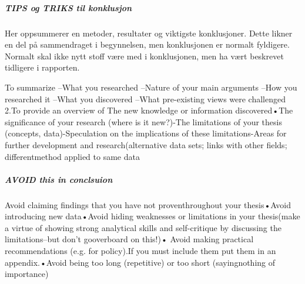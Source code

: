 \subparagraph{TIPS og TRIKS til konklusjon}
Her oppsummerer en metoder, resultater og viktigste konklusjoner. Dette likner en del på 
sammendraget i begynnelsen, men konklusjonen er normalt fyldigere. Normalt skal ikke nytt stoff 
være med i konklusjonen, men ha vært beskrevet tidligere i rapporten. 

To summarize
 –What you researched –Nature of your main arguments –How you researched it –What you discovered –What pre-existing views were challenged
2.To provide an overview of 
The new knowledge or information discovered•The significance of your research (where is it new?)-The limitations of your thesis (concepts, data)-Speculation on the implications of these limitations-Areas for further development and research(alternative data sets; links with other fields; differentmethod applied to same data
\subparagraph{AVOID this in conclsuion}
Avoid claiming findings that you have not proventhroughout your thesis•Avoid introducing new data•Avoid hiding weaknesses or limitations in your thesis(make a virtue of showing strong analytical skills and self-critique by discussing the limitations--but don’t gooverboard on this!)• Avoid making practical recommendations (e.g. for policy).If you must include them put them in an appendix.•Avoid being too long (repetitive) or too short (sayingnothing of importance)
